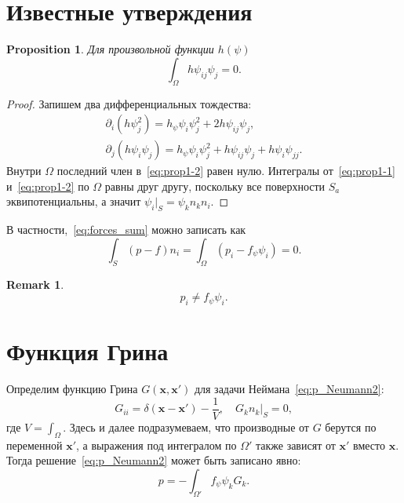 \documentclass{article}
\newtheorem{proposition}{Proposition}
\newtheorem{remark}{Remark}
\newcommand{\bx}{\boldsymbol{x}}
\begin{document}
\section{Известные утверждения}

\begin{proposition}\label{prop:integral_mixed}
Для произвольной функции \(h(\psi)\)
\begin{equation}\label{eq:integral_mixed}
    \int_\Omega h \psi_{ij} \psi_j = 0.
\end{equation}
\end{proposition}

\begin{proof}
Запишем два дифференциальных тождества:
\begin{gather}
    \partial_i\left( h\psi_j^2 \right) = h_\psi\psi_i\psi_j^2 + 2h\psi_{ij}\psi_j, \label{eq:prop1-1}\\
    \partial_j\left( h\psi_i\psi_j \right) = h_\psi\psi_i\psi_j^2 + h\psi_{ij}\psi_j + h\psi_i\psi_{jj}. \label{eq:prop1-2}
\end{gather}
Внутри \(\Omega\) последний член в~\eqref{eq:prop1-2} равен нулю.
Интегралы от~\eqref{eq:prop1-1} и~\eqref{eq:prop1-2} по \(\Omega\) равны друг другу,
поскольку все поверхности \(S_a\) эквипотенциальны, а значит \(\psi_i|_S = \psi_k n_k n_i\).
\end{proof}

В частности,~\eqref{eq:forces_sum} можно записать как
\begin{equation}\label{eq:forces_sum2}
    \int_S\left( p - f \right)n_i = \int_\Omega \left( p_i - f_\psi\psi_i \right) = 0.
\end{equation}

\begin{remark}
    \[ p_i \neq f_\psi\psi_i. \]
\end{remark}

\section{Функция Грина}

Определим функцию Грина \(G(\bx, \bx')\) для задачи Неймана~\eqref{eq:p_Neumann2}:
\begin{equation}\label{eq:Green_function}
    G_{ii} = \delta(\bx-\bx') - \frac1V, \quad
    \left. G_k n_k \right|_S = 0,
\end{equation}
где \(V = \int_\Omega\). Здесь и далее подразумеваем, что производные от \(G\)
берутся по переменной \(\bx'\), а выражения под интегралом по \(\Omega'\) также
зависят от \(\bx'\) вместо \(\bx\).
Тогда решение~\eqref{eq:p_Neumann2} может быть записано явно:
\begin{equation}\label{eq:pressure_solution}
    p = -\int_{\Omega'} f_\psi \psi_k G_k.
\end{equation}
\end{document}
